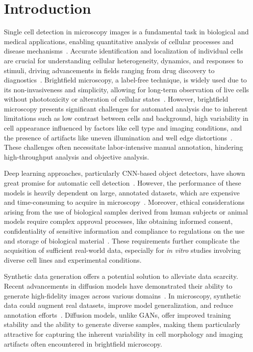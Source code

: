 \section{Introduction}
\label{sec:introduction}
Single cell detection in microscopy images is a fundamental task in biological and medical applications, enabling quantitative analysis of cellular processes and disease mechanisms~\cite{meijering_cell_2012}.
Accurate identification and localization of individual cells are crucial for understanding cellular heterogeneity, dynamics, and responses to stimuli, driving advancements in fields ranging from drug discovery to diagnostics~\cite{f_mualla_automatic_2016,e_d_ferreira_classification_2024}.
Brightfield microscopy, a label-free technique, is widely used due to its non-invasiveness and simplicity, allowing for long-term observation of live cells without phototoxicity or alteration of cellular states~\cite{jyrki_selinummi_bright_2009,huixia_ren_cellbow_2020}.
However, brightfield microscopy presents significant challenges for automated analysis due to inherent limitations such as low contrast between cells and background, high variability in cell appearance influenced by factors like cell type and imaging conditions, and the presence of artifacts like uneven illumination and well edge distortions~\cite{jyrki_selinummi_bright_2009,f_mualla_automatic_2016}.
These challenges often necessitate labor-intensive manual annotation, hindering high-throughput analysis and objective analysis.

Deep learning approaches, particularly CNN-based object detectors, have shown great promise for automatic cell detection~\cite{erick_moen_deep_2019,thorsten_falk_u-net_2019}.
However, the performance of these models is heavily dependent on large, annotated datasets, which are expensive and time-consuming to acquire in microscopy~\cite{ronneberger_u-net_2015}.
Moreover, ethical considerations arising from the use of biological samples derived from human subjects or animal models require complex approval processes, like obtaining informed consent, confidentiality of sensitive information and compliance to regulations on the use and storage of biological material~\cite{anne_cambonthomsen_series_2007,i_galende_ethical_2023,gregory_pappas_exploring_2005}.
These requirements further complicate the acquisition of sufficient real-world data, especially for \textit{in vitro} studies involving diverse cell lines and experimental conditions.

Synthetic data generation offers a potential solution to alleviate data scarcity.
Recent advancements in diffusion models have demonstrated their ability to generate high-fidelity images across various domains~\cite{ho_denoising_2020,song_denoising_2020}.
In microscopy, synthetic data could augment real datasets, improve model generalization, and reduce annotation efforts~\cite{rajaram_simucell_2012,trampert_deep_2021,lehmussola_synthetic_2008}.
Diffusion models, unlike GANs, offer improved training stability and the ability to generate diverse samples, making them particularly attractive for capturing the inherent variability in cell morphology and imaging artifacts often encountered in brightfield microscopy.

